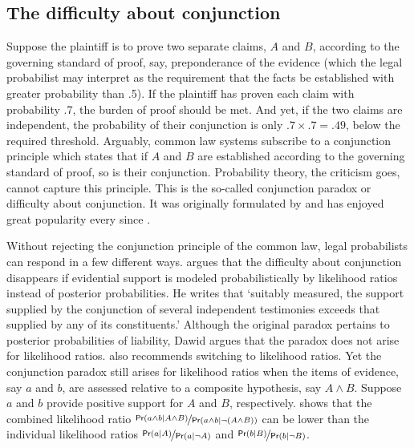 \documentclass{article}
\newcommand{\pr}{\mathsf{Pr}}
\begin{document}
\subsection{The difficulty about conjunction}

\label{subsec:conj}


Suppose the plaintiff is to prove two separate claims, $A$ and $B$, according to the governing standard of proof, say, preponderance of the evidence (which the legal probabilist may interpret as the requirement that the facts be established with greater  probability than .5). If the plaintiff has proven each claim with   probability .7, the burden of proof should be met. And yet, if the two claims are independent, the probability of their conjunction is only $.7\times.7=.49$, below the required threshold.  %
Arguably, common law systems subscribe to a conjunction principle which states that if $A$ and $B$ are established according to the governing standard of proof, so is their conjunction. Probability theory, the criticism goes, cannot capture this principle. This is the so-called conjunction paradox or difficulty about conjunction. It was originally formulated by \cite{Cohen1977The-probable-an} and has enjoyed great popularity every since \citep{Allen1986A-Reconceptuali,Stein2005Foundations-of-,allen2013,haack2011legal,schwartz2017ConjunctionProblemLogic,AllenPardo2019relative}. 


Without rejecting the conjunction principle of the common law, legal probabilists can respond  in a few different ways. 
\citet{dawid1987difficulty} 
argues that the difficulty about conjunction disappears if evidential support is modeled probabilistically by likelihood ratios instead of posterior probabilities. 
He writes that 
`suitably measured, the support supplied by the conjunction of several independent testimonies exceeds that supplied by any of its constituents.' %
 Although the original paradox pertains to  posterior probabilities of liability, Dawid argues that the  paradox does not arise for likelihood ratios. %
 \cite{garbolino2014} also recommends switching to likelihood ratios. %
 Yet the conjunction paradox   still arises for likelihood ratios 
when the items of evidence, say $a$ and $b$, are assessed relative to a composite hypothesis, say $A \wedge B$. Suppose $a$ and $b$ provide positive support for  $A$ and $B$, respectively.  
 \cite{Urbaniak2019standards2} shows that the combined likelihood ratio $\nicefrac{\pr(a \wedge b | A\wedge B)}{\pr(a\wedge b | \neg (A \wedge B))}$ can be lower than the individual likelihood ratios $\nicefrac{\pr(a | A)}{\pr(a | \neg A)}$ and $\nicefrac{\pr(b | B)}{\pr(b | \neg B)}$.
 
\end{document}

